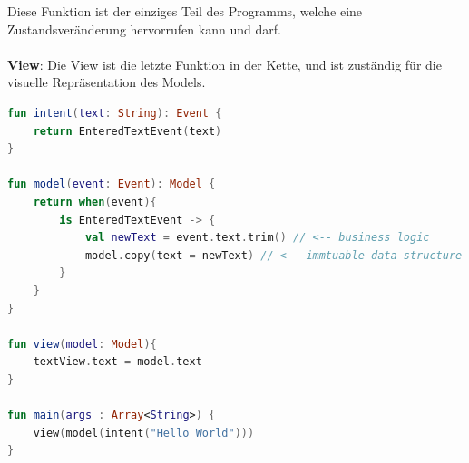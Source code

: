 Diese Funktion ist der einziges Teil des Programms, welche eine Zustandsveränderung hervorrufen kann und darf.
\\
\\
\textbf{View}: Die View ist die letzte Funktion in der Kette, und ist zuständig für die visuelle Repräsentation des Models.
\newpage
\begin{lstlisting}[caption={pseudo mvi implementation}, label={lst:pseudo-mvi}, language=Kotlin]
fun intent(text: String): Event {
	return EnteredTextEvent(text)
}

fun model(event: Event): Model {
	return when(event){
		is EnteredTextEvent -> {
			val newText = event.text.trim() // <-- business logic
			model.copy(text = newText) // <-- immtuable data structure
		}
	}
}

fun view(model: Model){
	textView.text = model.text 	
}

fun main(args : Array<String>) {
	view(model(intent("Hello World")))
}

\end{lstlisting}
